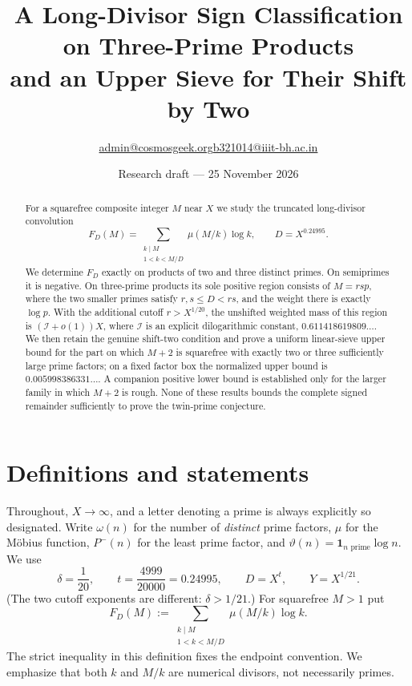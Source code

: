 \documentclass[11pt]{article}
\title{A Long-Divisor Sign Classification on Three-Prime Products\\
\large and an Upper Sieve for Their Shift by Two}
\author{\small \href{mailto:admin@cosmosgeek.org}{admin@cosmosgeek.org}\qquad \href{mailto:b321014@iiit-bh.ac.in}{b321014@iiit-bh.ac.in}}
\date{\small Research draft --- 25 November 2026}
\newcommand{\one}{\mathbf 1}
\newcommand{\phimin}{P^-}
\newcommand{\thetap}{\vartheta}
\begin{document}
\maketitle
\begin{abstract}
For a squarefree composite integer $M$ near $X$ we study the truncated
long-divisor convolution
\[
 F_D(M)=\sum_{\substack{k\mid M\\1<k<M/D}}\mu(M/k)\log k,
 \qquad D=X^{0.24995}.
\]
We determine $F_D$ exactly on products of two and three distinct primes.
On semiprimes it is negative.  On three-prime products its sole positive
region consists of $M=rsp$, where the two smaller primes satisfy
$r,s\le D<rs$, and the weight there is exactly $\log p$.
With the additional cutoff \(r>X^{1/20}\), the unshifted weighted mass of this region is
$(\mathcal I+o(1))X$, where $\mathcal I$ is an explicit dilogarithmic
constant, $0.611418619809\ldots$.
We then retain the genuine shift-two condition and prove a uniform
linear-sieve upper bound for the part on which $M+2$ is squarefree with
exactly two or three sufficiently large prime factors; on a fixed factor
box the normalized upper bound is $0.005998386331\ldots$.
A companion positive lower bound is established only for the larger
family in which $M+2$ is rough.  None of these results bounds the
complete signed remainder sufficiently to prove the twin-prime conjecture.
\end{abstract}

\section{Definitions and statements}

Throughout, $X\to\infty$, and a letter denoting a prime is always
explicitly so designated.  Write $\omega(n)$ for the number of
\emph{distinct} prime factors, $\mu$ for the M\"obius function,
$\phimin(n)$ for the least prime factor, and
$\thetap(n)=\one_{n\text{ prime}}\log n$.
We use
\[
 \delta=\frac1{20},\qquad t=\frac{4999}{20000}=0.24995,
 \qquad D=X^t,\qquad Y=X^{1/21}.
\]
(The two cutoff exponents are different: $\delta>1/21$.)
For squarefree $M>1$ put
\begin{equation}\label{eq:F}
 F_D(M):=\sum_{\substack{k\mid M\\1<k<M/D}}
                 \mu(M/k)\log k.
\end{equation}
The strict inequality in this definition fixes the endpoint convention.
We emphasize that both $k$ and $M/k$ are numerical divisors, not
necessarily primes.
\end{document}
